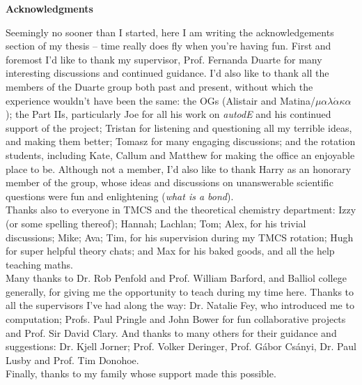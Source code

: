 \documentclass[main.tex]{subfiles}
\begin{document}
	\begin{center}
		{\bfseries\Large \textsf{Acknowledgments}}
	\end{center}
    \null
	\vspace{-0.9cm}
	Seemingly no sooner than I started, here I am writing the acknowledgements section of my thesis -- time really does fly when you're having fun. First and foremost I'd like to thank my supervisor, Prof. Fernanda Duarte for many interesting discussions and continued guidance. I'd also like to thank all the members of the Duarte group both past and present, without which the experience wouldn't have been the same: the OGs (Alistair and Matina/$\mu\alpha\lambda\acute{\alpha}\kappa\alpha$); the Part \RN{1}\RN{1}s, particularly Joe for all his work on \emph{autodE} and his continued support of the project; Tristan for listening and questioning all my terrible ideas, and making them better; Tomasz for many engaging discussions; and the rotation students, including Kate, Callum and Matthew for making the office an enjoyable place to be. Although not a member, I'd also like to thank Harry as an honorary member of the group, whose ideas and discussions on unanswerable scientific questions were fun and enlightening (\emph{what is a bond}\textinterrobang).  
	\vspace{0.4cm}
	\\
	Thanks also to everyone in TMCS and the theoretical chemistry department: Izzy (or some spelling thereof); Hannah; Lachlan; Tom; Alex, for his trivial discussions; Mike; Ava; Tim, for his supervision during my TMCS rotation; Hugh for super helpful theory chats; and Max for his baked goods, and all the help teaching maths.
	\vspace{0.4cm}
	\\
	Many thanks to Dr. Rob Penfold and Prof. William Barford, and Balliol college generally, for giving me the opportunity to teach during my time here. Thanks to all the supervisors I've had along the way: Dr. Natalie Fey, who introduced me to computation; Profs. Paul Pringle and John Bower for fun collaborative projects and Prof. Sir David Clary. And thanks to many others for their guidance and suggestions: Dr. Kjell Jorner; Prof. Volker Deringer, Prof. G\'abor Cs\'anyi, Dr. Paul Lusby and Prof. Tim Donohoe.
	\vspace{0.4cm}
	\\
	Finally, thanks to my family whose support made this possible.
	
\end{document}
